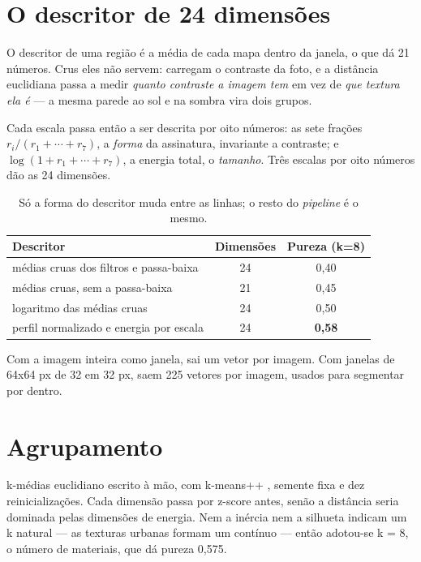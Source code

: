 \documentclass[12pt]{article}
\begin{document}
\section{O descritor de 24 dimensões}

O descritor de uma região é a média de cada mapa dentro da janela, o que dá 21
números. Crus eles não servem: carregam o contraste da foto, e a distância
euclidiana passa a medir \textit{quanto contraste a imagem tem} em vez de
\textit{que textura ela é} --- a mesma parede ao sol e na sombra vira dois
grupos.

Cada escala passa então a ser descrita por oito números: as sete frações
$r_i / (r_1 + \cdots + r_7)$, a \textit{forma} da assinatura, invariante a
contraste; e $\log(1 + r_1 + \cdots + r_7)$, a energia total, o
\textit{tamanho}. Três escalas por oito números dão as 24 dimensões.

\begin{table}[htb]
\centering
\caption{Só a forma do descritor muda entre as linhas; o resto do
  \textit{pipeline} é o mesmo.}
\label{tab:descritor}
\begin{tabular}{lcc}
\hline
\textbf{Descritor} & \textbf{Dimensões} & \textbf{Pureza (k=8)} \\
\hline
médias cruas dos filtros e passa-baixa  & 24 & 0,40 \\
médias cruas, sem a passa-baixa         & 21 & 0,45 \\
logaritmo das médias cruas              & 24 & 0,50 \\
perfil normalizado e energia por escala & 24 & \textbf{0,58} \\
\hline
\end{tabular}
\end{table}

Com a imagem inteira como janela, sai um vetor por imagem. Com janelas de
64x64 px de 32 em 32 px, saem 225 vetores por imagem, usados para segmentar
por dentro.

\section{Agrupamento}

k-médias euclidiano escrito à mão, com k-means++ \cite{arthur:07}, semente
fixa e dez reinicializações. Cada dimensão passa por z-score antes, senão a
distância seria dominada pelas dimensões de energia. Nem a inércia nem a
silhueta indicam um k natural --- as texturas urbanas formam um contínuo ---
então adotou-se k = 8, o número de materiais, que dá pureza 0,575.
\end{document}
